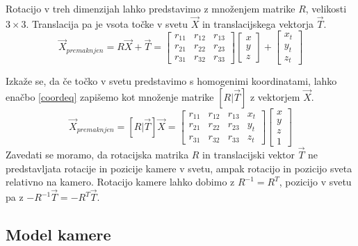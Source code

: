 \documentclass[a4paper, 12pt]{book}
\begin{document}
Rotacijo v treh dimenzijah lahko predstavimo z množenjem matrike $R$, velikosti $3 \times 3$. Translacija pa je vsota točke v svetu $\vec{X}$ in translacijskega vektorja $\vec{T}$.
\begin{equation}
\vec{X}_{premaknjen} = R \vec{X} + \vec{T} = 
\begin{bmatrix}
r_{11} & r_{12} & r_{13} \\
r_{21} & r_{22} & r_{23} \\
r_{31} & r_{32} & r_{33}
\end{bmatrix}
\begin{bmatrix}
x \\
y \\
z 
\end{bmatrix}
+
\begin{bmatrix}
x_t \\
y_t \\
z_t 
\end{bmatrix}
\label{coordeq}
\end{equation}

Izkaže se, da če točko v svetu predstavimo s homogenimi koordinatami, lahko enačbo \eqref{coordeq} zapišemo kot množenje matrike $[R | \vec{T}]$ z vektorjem $\vec{X}$.
\begin{equation}
\vec{X}_{premaknjen} = [R|\vec{T}] \vec{X} = 
\begin{bmatrix}
r_{11} & r_{12} & r_{13} & x_t\\
r_{21} & r_{22} & r_{23} & y_t\\
r_{31} & r_{32} & r_{33} & z_t
\end{bmatrix}
\begin{bmatrix}
x \\
y \\
z \\
1
\end{bmatrix}
\label{coordeq}
\end{equation}
Zavedati se moramo, da rotacijska matrika $R$ in translacijski vektor $\vec{T}$ ne predstavljata rotacije in pozicije kamere v svetu, ampak rotacijo in pozicijo sveta relativno na kamero. Rotacijo kamere lahko dobimo z $R^{-1} = R^T$, pozicijo v svetu pa z $-R^{-1} \vec{T} = -R^T \vec{T}$.

\subsection{Model kamere}
\end{document}
